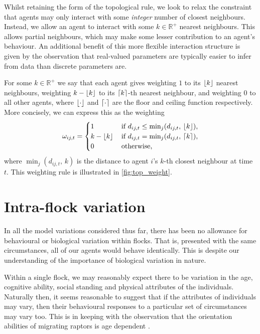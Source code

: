 Whilst retaining the form of the topological rule, we look to relax the
constraint that agents may only interact with some \emph{integer} number of
closest neighbours. Instead, we allow an agent to interact with some
$k\in\mathbb{R}^+$ nearest neighbours. This allows partial neighbours, which
may make some lesser contribution to an agent's behaviour. An additional
benefit of this more flexible interaction structure is given by the observation
that real-valued parameters are typically easier to infer from data than
discrete parameters are.

For some $k\in\mathbb{R}^+$ we say that each agent gives weighting $1$ to its
$\lfloor k\rfloor$ nearest neighbours, weighting $k - \lfloor k\rfloor$ to its $\lceil k\rceil$-th
nearest neighbour, and weighting $0$ to all other agents, where $\lfloor\cdot\rfloor$
and $\lceil\cdot\rceil$ are the floor and ceiling function respectively. More
concisely, we can express this as the weighting
\begin{equation}
  \label{eq:top_interaction}
  \omega_{ij,t} =
  \begin{cases}
    1           & \, \text{if } d_{ij, t} \leq \min_j(d_{ij,t},\, \lfloor k\rfloor), \\
    k-\lfloor k\rfloor & \, \text{if } d_{ij, t} = \min_j(d_{ij,t},\, \lceil k\rceil),     \\
    0           & \, \text{otherwise,}
  \end{cases}
\end{equation}
where $\min_j(d_{ij,t},\, k)$ is the distance to agent $i$'s $k$-th closest
neighbour at time $t$. This weighting rule is illustrated in
\cref{fig:top_weight}.

\section{Intra-flock variation}

In all the model variations considered thus far, there has been no allowance
for behavioural or biological variation within flocks. That is, presented with
the same circumstances, all of our agents would behave identically. This is
despite our understanding of the importance of biological variation in nature.

Within a single flock, we may reasonably expect there to be variation in the
age, cognitive ability, social standing and physical attributes of the
individuals. Naturally then, it seems reasonable to suggest that if the
attributes of individuals may vary, then their behavioural responses to a
particular set of circumstances may vary too. This is in keeping with the
observation that the orientation abilities of migrating raptors is age
dependent \parencite{thorup03}.

